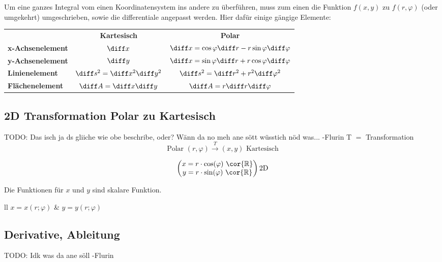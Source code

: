 Um eine ganzes Integral vom einen Koordinatensystem ins andere zu überführen, muss zum einen die Funktion $ f(x, y) $ zu $ f(r, \varphi) $ (oder umgekehrt) umgeschrieben, sowie die differentiale angepasst werden.
Hier dafür einige gängige Elemente:

\begin{tabular}{l c c}
                         & \bf{Kartesisch}                   & \bf{Polar}                                                       \\
    \bf{x-Achsenelement} & $\diff x$                         & $\diff x = \cos \varphi \diff r - r \sin \varphi \diff \varphi$  \\
    \bf{y-Achsenelement} & $\diff y$                         & $\diff x = \sin \varphi \diff r + r \cos \varphi \diff \varphi$  \\
    \bf{Linienelement  } & $\diff s^2 = \diff x^2 \diff y^2$ & $\diff s^2 = \diff r^2 + r^2 \diff \varphi^2$                    \\
    \bf{Flächenelement } & $\diff A = \diff x \diff y$       & $\diff A = r \diff r \diff \varphi$                              \\
\end{tabular}

\subsection{2D Transformation Polar zu Kartesisch}
TODO: Das isch ja ds gliiche wie obe beschribe, oder?
      Wänn da no meh ane sött wüsstich nöd was... -Flurin
T $=$ Transformation
\[
    \text{Polar } (r,\varphi) \xrightarrow{T} (x,y) \text{ Kartesisch}
\]

\[
\begin{pmatrix}
    x=r\cdot\cos(\varphi) \text{ } \cor{\mathbb{R}} \\
    y=r\cdot\sin(\varphi) \text{ } \cor{\mathbb{R}} 
\end{pmatrix}
\text{2D}
\]

Die Funktionen für $x$ und $y$ sind skalare Funktion.

    \begin{ctabular}{ll}
        $x=x(r;\varphi)$ & $ y=y(r;\varphi)$
    \end{ctabular}

\subsection{Derivative, Ableitung}
TODO: Idk was da ane söll -Flurin

